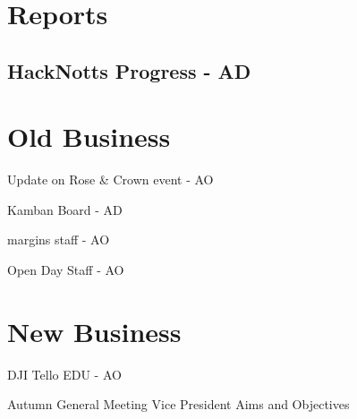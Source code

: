 \documentclass[11pt,hacksoc, agenda]{meetingmins}
\begin{document}
\maketitle

\section{Reports}

\subsection{HackNotts Progress - AD}
\begin{hiddensubitems}
\item
\end{hiddensubitems}

\section{Old Business}
\begin{items}
	\item Update on Rose & Crown event - AO
	\item Kamban Board - AD
	\item margins staff - AO
	\item Open Day Staff - AO
\end{items}

\section{New Business}
\begin{items}
	\item DJI Tello EDU - AO
	\item Autumn General Meeting
		\subitem Vice President
		\subitem Aims and Objectives
\end{items}

\vspace{1em}
\nextmeeting{}
\end{document}
